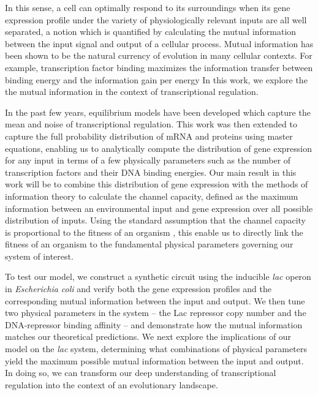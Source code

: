In this sense, a cell can optimally respond to its surroundings when its gene
expression profile under the variety of physiologically relevant inputs are all
well separated, a notion which is quantified by calculating the mutual
information between the input signal and output of a cellular process. Mutual
information has been shown to be the natural currency of evolution in many
cellular contexts. For example, transcription factor binding maximizes the
information transfer between binding energy and the information gain per energy
\cite{Savir2016} In this work, we explore the the mutual information in the
context of transcriptional regulation.

In the past few years, equilibrium models have been developed which capture the
mean \cite{Garcia2011c} and noise \cite{Jones2014a} of transcriptional
regulation. This work was then extended to capture the full probability
distribution of mRNA \cite{Sanchez2013} and proteins \cite{Shahrezaei2008,
	Swain2016} using master equations, enabling us to analytically compute the
distribution of gene expression for any input in terms of a few physically
parameters such as the number of transcription factors and their DNA binding
energies. Our main result in this work will be to combine this distribution of
gene expression with the methods of information theory to calculate the channel
capacity, defined as the maximum information between an environmental input and
gene expression over all possible distribution of inputs. Using the standard
assumption that the channel capacity is proportional to the fitness of an
organism \cite{Tkacik2008a}, this enable us to directly link the fitness of an
organism to the fundamental physical parameters governing our system of
interest.

To test our model, we construct a synthetic circuit using the inducible
\textit{lac} operon in \textit{Escherichia coli} and verify both the gene
expression profiles and the corresponding mutual information between the input
and output. We then tune two physical parameters in the system -- the Lac
repressor copy number and the DNA-repressor binding affinity -- and demonstrate
how the mutual information matches our theoretical predictions. We next explore
the implications of our model on the \textit{lac} system, determining what
combinations of physical parameters yield the maximum possible mutual
information between the input and output. In doing so, we can transform our deep
understanding of transcriptional regulation into the context of an evolutionary
landscape.


